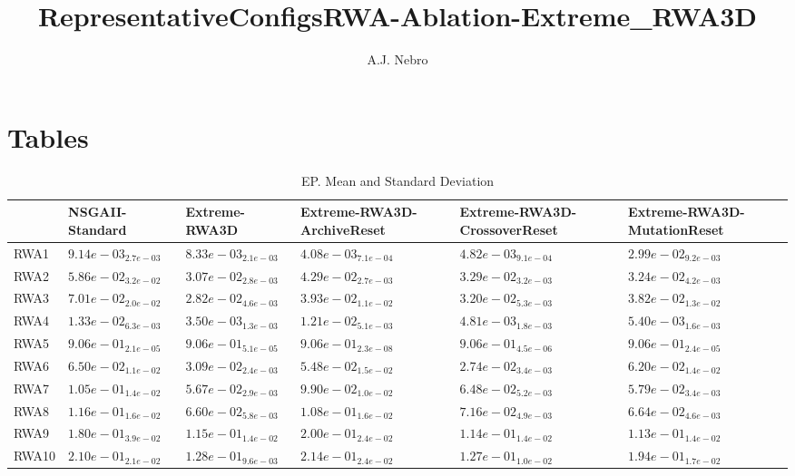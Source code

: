 \documentclass{article}
\title{RepresentativeConfigsRWA-Ablation-Extreme_RWA3D}
\author{A.J. Nebro}
\begin{document}
\maketitle
\section{Tables}

\begin{table}
\caption{EP. Mean and Standard Deviation}
\label{table: EP}
\centering
\begin{scriptsize}
\begin{tabular}{llllll}
\hline & NSGAII-Standard & Extreme-RWA3D & Extreme-RWA3D-ArchiveReset & Extreme-RWA3D-CrossoverReset &  Extreme-RWA3D-MutationReset\\
\hline 
RWA1 & $  9.14e-03_{ 2.7e-03}$ & $  8.33e-03_{ 2.1e-03}$ & \cellcolor{gray95}$  4.08e-03_{ 7.1e-04}$ & \cellcolor{gray25}$  4.82e-03_{ 9.1e-04}$ & $  2.99e-02_{ 9.2e-03}$ \\
RWA2 & $  5.86e-02_{ 3.2e-02}$ & \cellcolor{gray95}$  3.07e-02_{ 2.8e-03}$ & $  4.29e-02_{ 2.7e-03}$ & $  3.29e-02_{ 3.2e-03}$ & \cellcolor{gray25}$  3.24e-02_{ 4.2e-03}$ \\
RWA3 & $  7.01e-02_{ 2.0e-02}$ & \cellcolor{gray95}$  2.82e-02_{ 4.6e-03}$ & $  3.93e-02_{ 1.1e-02}$ & \cellcolor{gray25}$  3.20e-02_{ 5.3e-03}$ & $  3.82e-02_{ 1.3e-02}$ \\
RWA4 & $  1.33e-02_{ 6.3e-03}$ & \cellcolor{gray95}$  3.50e-03_{ 1.3e-03}$ & $  1.21e-02_{ 5.1e-03}$ & \cellcolor{gray25}$  4.81e-03_{ 1.8e-03}$ & $  5.40e-03_{ 1.6e-03}$ \\
RWA5 & $  9.06e-01_{ 2.1e-05}$ & $  9.06e-01_{ 5.1e-05}$ & \cellcolor{gray95}$  9.06e-01_{ 2.3e-08}$ & \cellcolor{gray25}$  9.06e-01_{ 4.5e-06}$ & $  9.06e-01_{ 2.4e-05}$ \\
RWA6 & $  6.50e-02_{ 1.1e-02}$ & \cellcolor{gray25}$  3.09e-02_{ 2.4e-03}$ & $  5.48e-02_{ 1.5e-02}$ & \cellcolor{gray95}$  2.74e-02_{ 3.4e-03}$ & $  6.20e-02_{ 1.4e-02}$ \\
RWA7 & $  1.05e-01_{ 1.4e-02}$ & \cellcolor{gray95}$  5.67e-02_{ 2.9e-03}$ & $  9.90e-02_{ 1.0e-02}$ & $  6.48e-02_{ 5.2e-03}$ & \cellcolor{gray25}$  5.79e-02_{ 3.4e-03}$ \\
RWA8 & $  1.16e-01_{ 1.6e-02}$ & \cellcolor{gray95}$  6.60e-02_{ 5.8e-03}$ & $  1.08e-01_{ 1.6e-02}$ & $  7.16e-02_{ 4.9e-03}$ & \cellcolor{gray25}$  6.64e-02_{ 4.6e-03}$ \\
RWA9 & $  1.80e-01_{ 3.9e-02}$ & $  1.15e-01_{ 1.4e-02}$ & $  2.00e-01_{ 2.4e-02}$ & \cellcolor{gray25}$  1.14e-01_{ 1.4e-02}$ & \cellcolor{gray95}$  1.13e-01_{ 1.4e-02}$ \\
RWA10 & $  2.10e-01_{ 2.1e-02}$ & \cellcolor{gray25}$  1.28e-01_{ 9.6e-03}$ & $  2.14e-01_{ 2.4e-02}$ & \cellcolor{gray95}$  1.27e-01_{ 1.0e-02}$ & $  1.94e-01_{ 1.7e-02}$ \\
\hline
\end{tabular}
\end{scriptsize}
\end{table}
\end{document}
